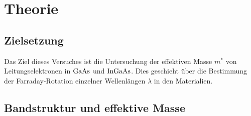 \section{Theorie}

\subsection{Zielsetzung}

\noindent 
Das Ziel dieses Versuches ist die Untersuchung der effektiven Masse $m^*$ von Leitungselektronen in $\ce{GaAs}$ und $\ce{InGaAs}$. 
Dies geschieht über die Bestimmung der Farraday-Rotation einzelner Wellenlängen $\lambda$ in den Materialien.

\subsection{Bandstruktur und effektive Masse}
       

\noindent

  




